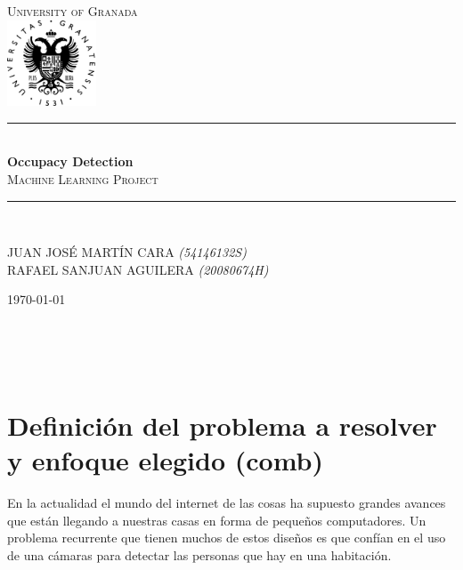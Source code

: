 \documentclass{article}
\newcommand{\HRule}{\rule{\linewidth}{0.5mm}}
\begin{document}

\begin{titlepage}
\begin{center}

\textsc{\LARGE University of Granada}\\[1.5cm]

\includegraphics[width=100px]{ugrlogo.png}


\vfill
\HRule \\[0.4cm]
{\huge \bfseries Occupacy Detection}\\[0.4cm]
\textsc{\Large Machine Learning Project}\\[0.5cm]
\HRule \\[1.5cm]
 

\begin{center}
    \textsc{JUAN JOSÉ MARTÍN CARA} \textit{(54146132S)} \\
    \textsc{RAFAEL SANJUAN AGUILERA} \textit{(20080674H)} \\
\end{center}

\vfill
{\large \today}\\[4cm] %

\vfill
\end{center}

\end{titlepage}

\newpage
\tableofcontents





~\\
~\\
~\\
\newpage


\section{Definición del problema a resolver y enfoque elegido (comb)}

En la actualidad el mundo del internet de las cosas ha supuesto grandes avances que están llegando a nuestras casas en forma de pequeños computadores. Un problema recurrente que tienen muchos de estos diseños es que confían en el uso de una cámaras para detectar las personas que hay en una habitación.
\end{document}
